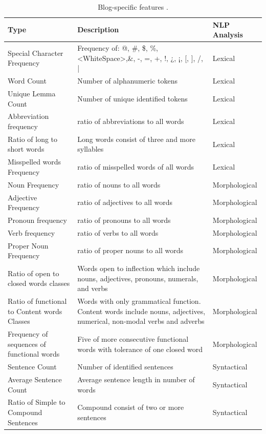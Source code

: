 \begin{table}[t]
	\center
	\caption {Blog-specific features  \parencite{virik2017blog}.}\label{chap:relevant_work:tbl:blogs_special_features}
	\begin{tabular}{p{4cm}p{7cm}p{3cm}}
		\hline
		Type & Description & NLP Analysis\\
		\hline
		Special Character Frequency & Frequency of: @, \#, \$, \%, <WhiteSpace>,\&, -, =, +, !,  ¿, ¡, [, ], /, | & Lexical \\
		Word Count & Number of alphanumeric tokens & Lexical \\
        Unique Lemma Count & Number of unique identified tokens & Lexical \\
        Abbreviation frequency & ratio of abbreviations to all words & Lexical \\
        Ratio of long to short words & Long words consist of three and more syllables & Lexical \\
        Misspelled words Frequency & ratio of misspelled words of all words & Lexical\\
		Noun Frequency & ratio of nouns to all words & Morphological \\
        Adjective Frequency & ratio of adjectives to all words & Morphological \\
        Pronoun frequency & ratio of pronouns to all words & Morphological \\
        Verb frequency & ratio of verbs to all words & Morphological \\
        Proper Noun Frequency & ratio of proper nouns to all words & Morphological \\
        Ratio of open to closed words classes & Words open to inflection which include nouns, adjectives, pronouns, numerals, and verbs  & Morphological \\
        Ratio of functional to Content words Classes & Words with only grammatical function. Content words include nouns, adjectives, numerical, non-modal verbs and adverbs  & Morphological \\
        Frequency of sequences of functional words & Five of more consecutive functional words with tolerance of one closed word & Morphological \\
		Sentence Count & Number of identified sentences & Syntactical \\
        Average Sentence Count & Average sentence length in number of words & Syntactical \\
        Ratio of Simple to Compound Sentences & Compound consist of two or more sentences & Syntactical \\

\end{tabular}
\end{table}

